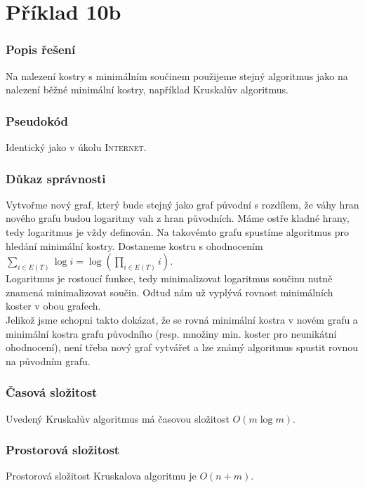 \documentclass[11pt,a4paper]{article}
\begin{document}
\part*{Příklad 10b}
\section{Popis řešení}
Na nalezení kostry s minimálním součinem použijeme stejný algoritmus jako na nalezení běžné minimální kostry, například Kruskalův algoritmus.
\section{Pseudokód}
Identický jako v úkolu \textsc{Internet}.
\section{Důkaz správnosti}
Vytvořme nový graf, který bude stejný jako graf původní s rozdílem, že váhy hran nového grafu budou logaritmy vah z hran původních. Máme ostře kladné hrany, tedy logaritmus je vždy definován. Na takovémto grafu spustíme algoritmus pro hledání minimální kostry. Dostaneme kostru s ohodnocením $\sum_{i \in E(T)} \log i = \log \left( \prod_{i \in E(T)} i \right)$. \\

Logaritmus je rostoucí funkce, tedy minimalizovat logaritmus součinu nutně znamená minimalizovat součin. Odtud nám už vyplývá rovnost minimálních koster v obou grafech.\\

Jelikož jsme schopni takto dokázat, že se rovná minimální kostra v novém grafu a minimální kostra grafu původního (resp. množiny min. koster pro neunikátní ohodnocení), není třeba nový graf vytvářet a lze známý algoritmus spustit rovnou na původním grafu.
\section{Časová složitost}
Uvedený Kruskalův algoritmus má časovou složitost $O(m\log m)$.
\section{Prostorová složitost}
Prostorová složitost Kruskalova algoritmu je $O(n+m)$.
\end{document}
